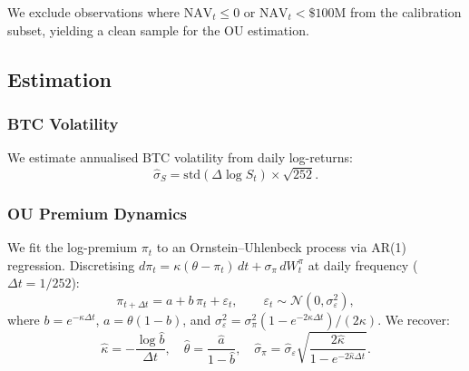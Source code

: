 We exclude observations where $\mathrm{NAV}_t \le 0$ or
$\mathrm{NAV}_t < \$100$M from the calibration subset, yielding
a clean sample for the OU estimation.

\subsection{Estimation}\label{sec:estimation}

\subsubsection{BTC Volatility}

We estimate annualised BTC volatility from daily log-returns:
\begin{equation}
  \hat\sigma_S = \mathrm{std}(\Delta\log S_t) \times \sqrt{252}.
\end{equation}

\subsubsection{OU Premium Dynamics}

We fit the log-premium $\pi_t$ to an Ornstein--Uhlenbeck process via
AR(1) regression.  Discretising $d\pi_t = \kappa(\theta - \pi_t)\,dt
+ \sigma_\pi\,dW_t^\pi$ at daily frequency ($\Delta t = 1/252$):
\begin{equation}
  \pi_{t+\Delta t} = a + b\,\pi_t + \varepsilon_t,
  \qquad \varepsilon_t \sim \mathcal{N}(0, \sigma_\varepsilon^2),
\end{equation}
where $b = e^{-\kappa\Delta t}$, $a = \theta(1-b)$, and
$\sigma_\varepsilon^2 = \sigma_\pi^2(1 - e^{-2\kappa\Delta t})/(2\kappa)$.
We recover:
\begin{equation}
  \hat\kappa = -\frac{\log\hat{b}}{\Delta t},
  \quad
  \hat\theta = \frac{\hat{a}}{1-\hat{b}},
  \quad
  \hat\sigma_\pi = \hat\sigma_\varepsilon
    \sqrt{\frac{2\hat\kappa}{1 - e^{-2\hat\kappa\Delta t}}}.
\end{equation}

